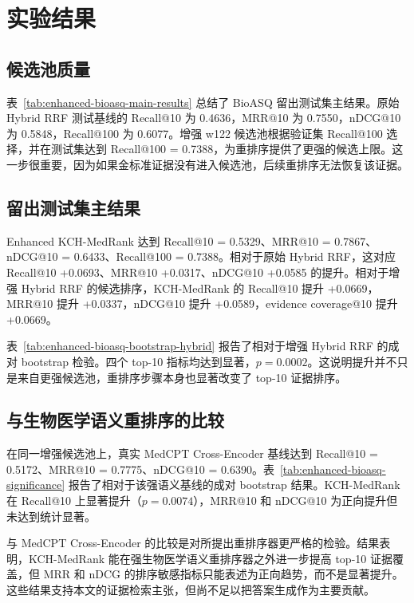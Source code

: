 \section{实验结果}

\subsection{候选池质量}

表~\ref{tab:enhanced-bioasq-main-results} 总结了 BioASQ 留出测试集主结果。原始 Hybrid RRF 测试基线的 Recall@10 为 0.4636，MRR@10 为 0.7550，nDCG@10 为 0.5848，Recall@100 为 0.6077。增强 w122 候选池根据验证集 Recall@100 选择，并在测试集达到 Recall@100 = 0.7388，为重排序提供了更强的候选上限。这一步很重要，因为如果金标准证据没有进入候选池，后续重排序无法恢复该证据。



\subsection{留出测试集主结果}

Enhanced KCH-MedRank 达到 Recall@10 = 0.5329、MRR@10 = 0.7867、nDCG@10 = 0.6433、Recall@100 = 0.7388。相对于原始 Hybrid RRF，这对应 Recall@10 +0.0693、MRR@10 +0.0317、nDCG@10 +0.0585 的提升。相对于增强 Hybrid RRF 的候选排序，KCH-MedRank 的 Recall@10 提升 +0.0669，MRR@10 提升 +0.0337，nDCG@10 提升 +0.0589，evidence coverage@10 提升 +0.0669。

表~\ref{tab:enhanced-bioasq-bootstrap-hybrid} 报告了相对于增强 Hybrid RRF 的成对 bootstrap 检验。四个 top-10 指标均达到显著，$p=0.0002$。这说明提升并不只是来自更强候选池，重排序步骤本身也显著改变了 top-10 证据排序。



\subsection{与生物医学语义重排序的比较}

在同一增强候选池上，真实 MedCPT Cross-Encoder 基线达到 Recall@10 = 0.5172、MRR@10 = 0.7775、nDCG@10 = 0.6390。表~\ref{tab:enhanced-bioasq-significance} 报告了相对于该强语义基线的成对 bootstrap 结果。KCH-MedRank 在 Recall@10 上显著提升（$p=0.0074$），MRR@10 和 nDCG@10 为正向提升但未达到统计显著。



与 MedCPT Cross-Encoder 的比较是对所提出重排序器更严格的检验。结果表明，KCH-MedRank 能在强生物医学语义重排序器之外进一步提高 top-10 证据覆盖，但 MRR 和 nDCG 的排序敏感指标只能表述为正向趋势，而不是显著提升。这些结果支持本文的证据检索主张，但尚不足以把答案生成作为主要贡献。

